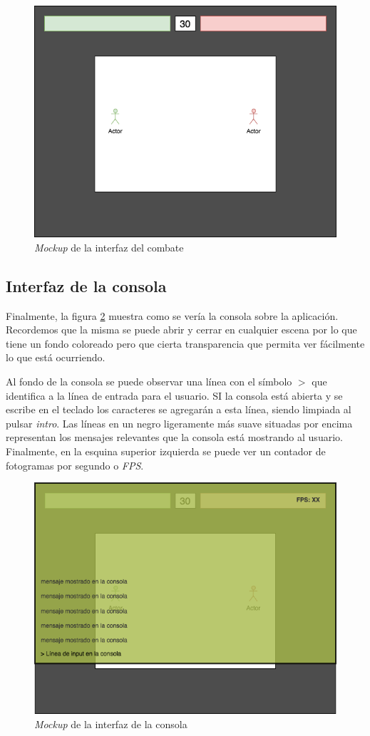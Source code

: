 \begin{figure}
	\centerline{\includegraphics[width=12cm]{otros/graphicalInterface/gameplay.png}}
	\caption{\textit{Mockup} de la interfaz del combate}
	\label{inter:combat}
\end{figure}

\subsection{Interfaz de la consola}

Finalmente, la figura \ref{inter:console} muestra como se vería la consola sobre la aplicación. Recordemos que la misma se puede abrir y cerrar en cualquier escena por lo que tiene un fondo coloreado pero que cierta transparencia que permita ver fácilmente lo que está ocurriendo.

\bigskip

Al fondo de la consola se puede observar una línea con el símbolo $>$ que identifica a la línea de entrada para el usuario. SI la consola está abierta y se escribe en el teclado los caracteres se agregarán a esta línea, siendo limpiada al pulsar \textit{intro}. Las líneas en un negro ligeramente más suave situadas por encima representan los mensajes relevantes que la consola está mostrando al usuario. Finalmente, en la esquina superior izquierda se puede ver un contador de fotogramas por segundo o \textit{FPS}.

\begin{figure}
	\centerline{\includegraphics[width=12cm]{otros/graphicalInterface/console.png}}
	\caption{\textit{Mockup} de la interfaz de la consola}
	\label{inter:console}
\end{figure}


